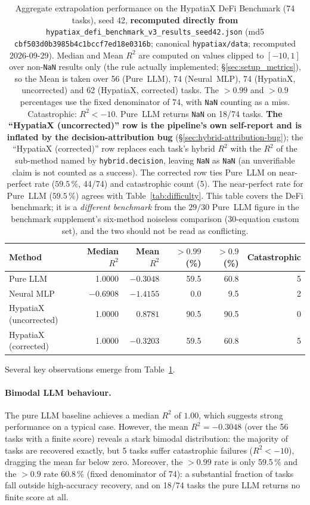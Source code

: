 \documentclass[twoside,11pt]{article}
\newcommand{\Rsq}{R^{2}}
\begin{document}
\begin{table}[h]
\centering
\caption{Aggregate extrapolation performance on the HypatiaX DeFi Benchmark (74 tasks),
seed 42, \textbf{recomputed directly from}
\texttt{hypatiax\_defi\_benchmark\_v3\_results\_seed42.json} (md5
\texttt{cbf503d0b3985b4c1bccf7ed18e0316b}; canonical \texttt{hypatiax/data}; recomputed 2026-09-29).
Median and Mean $\Rsq$ are computed on values clipped to $[-10,1]$ over
non-\texttt{NaN} results only (the rule actually implemented; \S\ref{sec:setup_metrics}),
so the Mean is taken over 56 (Pure~LLM), 74 (Neural~MLP), 74 (HypatiaX, uncorrected)
and 62 (HypatiaX, corrected) tasks. The $>0.99$ and $>0.9$ percentages use the fixed denominator
of 74, with \texttt{NaN} counting as a miss. Catastrophic: $\Rsq<-10$.
Pure~LLM returns \texttt{NaN} on 18/74 tasks. \textbf{The
``HypatiaX (uncorrected)'' row is the pipeline's own self-report and is
inflated by the decision-attribution bug} (\S\ref{sec:hybrid-attribution-bug}); the
``HypatiaX (corrected)'' row replaces each task's hybrid $\Rsq$ with the
$\Rsq$ of the sub-method named by \texttt{hybrid.decision}, leaving
\texttt{NaN} as \texttt{NaN} (an unverifiable claim is not counted as a success).
The corrected row ties Pure~LLM on near-perfect rate ($59.5\,\%$, 44/74) and
catastrophic count (5). The near-perfect rate for Pure~LLM ($59.5\,\%$) agrees with
Table~\ref{tab:difficulty}. This table
covers the DeFi benchmark; it is a \emph{different benchmark} from the $29/30$ Pure~LLM
figure in the benchmark supplement's six-method noiseless comparison
(30-equation custom set), and the two should not be read as conflicting.}
\label{tab:main_results}
\begin{tabular}{lrrrrr}
\toprule
Method & Median $\Rsq$ & Mean $\Rsq$ & $>0.99$ (\%) & $>0.9$ (\%) & Catastrophic \\
\midrule
Pure LLM & 1.0000 & $-0.3048$ & 59.5 & 60.8 & 5 \\
Neural MLP    & $-0.6908$ & $-1.4155$ & 0.0  & 9.5 & 2 \\
HypatiaX (uncorrected) & 1.0000 & $0.8781$ & 90.5 & 90.5 & 0 \\
HypatiaX (corrected) & 1.0000 & $-0.3203$ & 59.5 & 60.8 & 5 \\
\bottomrule
\end{tabular}
\end{table}

Several key observations emerge from Table~\ref{tab:main_results}.

\paragraph{Bimodal LLM behaviour.}
The pure LLM baseline achieves a median $\Rsq$ of $1.00$, which suggests strong
performance on a typical case.  However, the mean $\Rsq = -0.3048$ (over the 56 tasks with a finite score) reveals a
stark bimodal distribution: the majority of tasks are recovered exactly, but
5 tasks suffer catastrophic failures ($\Rsq < -10$), dragging the mean far below
zero.  Moreover, the $>0.99$ rate is only 59.5\,\% and the $>0.9$ rate 60.8\,\% (fixed
denominator of 74): a substantial fraction of tasks fall outside high-accuracy
recovery, and on 18/74 tasks the pure LLM returns no finite score at all.
\end{document}
